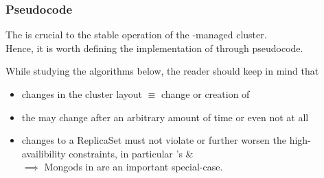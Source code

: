 \subsubsection{Pseudocode}

The  is crucial to the stable operation of the \mamid-managed cluster.\\
Hence, it is worth defining the implementation of  through pseudocode. %

While studying the algorithms below, the reader should keep in mind that
\begin{itemize}
  \item changes in the cluster layout $\equiv$ change or creation of  
  \item the  may change after an arbitrary amount of time or even not at all
  \item changes to a ReplicaSet must not violate or further worsen the high-availibility constraints,
        in particular 's  \& \\
        $\implies$ Mongods in  are an important special-case.
\end{itemize}


